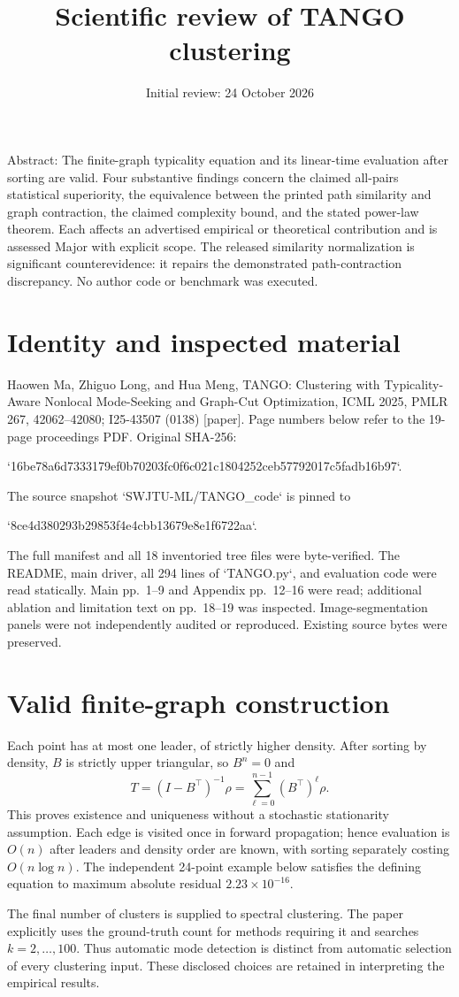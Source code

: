 \documentclass[10pt]{article}
\title{Scientific review of TANGO clustering}
\author{}
\date{Initial review: 24 October 2026}
\begin{document}
\maketitle
Abstract: The finite-graph typicality equation and its linear-time evaluation after sorting are valid. Four substantive findings concern the claimed all-pairs statistical superiority, the equivalence between the printed path similarity and graph contraction, the claimed complexity bound, and the stated power-law theorem. Each affects an advertised empirical or theoretical contribution and is assessed Major with explicit scope. The released similarity normalization is significant counterevidence: it repairs the demonstrated path-contraction discrepancy. No author code or benchmark was executed.\par
\section*{Identity and inspected material}
Haowen Ma, Zhiguo Long, and Hua Meng, TANGO: Clustering with Typicality-Aware Nonlocal Mode-Seeking and Graph-Cut Optimization, ICML 2025, PMLR 267, 42062–42080; I25-43507 (0138) [paper]. Page numbers below refer to the 19-page proceedings PDF. Original SHA-256:\par
`16be78a6d7333179ef0b70203fc0f6c021c1804252ceb57792017c5fadb16b97`.\par
The source snapshot `SWJTU-ML/TANGO\_code` is pinned to\par
`8ce4d380293b29853f4e4cbb13679e8e1f6722aa`.\par
The full manifest and all 18 inventoried tree files were byte-verified. The README, main driver, all 294 lines of `TANGO.py`, and evaluation code were read statically. Main pp. 1–9 and Appendix pp. 12–16 were read; additional ablation and limitation text on pp. 18–19 was inspected. Image-segmentation panels were not independently audited or reproduced. Existing source bytes were preserved.\par
\section*{Valid finite-graph construction}
Each point has at most one leader, of strictly higher density. After sorting by density, \(B\) is strictly upper triangular, so \(B^n=0\) and \[T=(I-B^\top)^{-1}\rho
   =\sum_{\ell=0}^{n-1}(B^\top)^\ell\rho.\] This proves existence and uniqueness without a stochastic stationarity assumption. Each edge is visited once in forward propagation; hence evaluation is \(O(n)\) after leaders and density order are known, with sorting separately costing \(O(n\log n)\). The independent 24-point example below satisfies the defining equation to maximum absolute residual \(2.23\times10^{-16}\).\par
The final number of clusters is supplied to spectral clustering. The paper explicitly uses the ground-truth count for methods requiring it and searches \(k=2,\ldots,100\). Thus automatic mode detection is distinct from automatic selection of every clustering input. These disclosed choices are retained in interpreting the empirical results.\par
\end{document}
